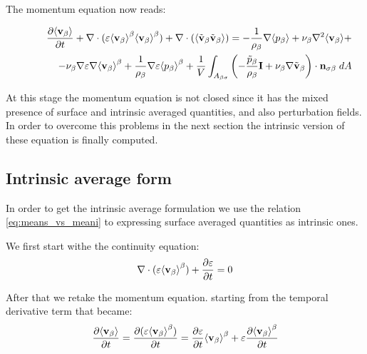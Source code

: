 
The momentum equation now reads:

\begin{eqnarray}
\dfrac{\partial {\left< \textbf{v}_{\beta}\right>}}{\partial t} + \nabla \cdot (\varepsilon {\left< \textbf{v}_{\beta}\right>}^{\beta}{\left< \textbf{v}_{\beta} \right>}^{\beta}) + \nabla \cdot ({\left< \tilde{\textbf{v}}_{\beta}\tilde{\textbf{v}}_{\beta} \right>}) = -\dfrac{1}{\rho_{\beta}} \nabla {\left< p_{\beta}\right>} + \nu_{\beta}\nabla^2 {\left< \textbf{v}_{\beta} \right>} + \nonumber \\
\qquad \qquad - \nu_{\beta} \nabla \varepsilon \nabla {\left< \textbf{v}_{\beta}\right>}^{\beta} +\dfrac{1}{\rho_{\beta}}\nabla\varepsilon {\left< p_{\beta}\right>}^{\beta} +\dfrac{1}{V} \displaystyle\int_{A_{\beta \sigma}} \left( -\dfrac{\tilde{p}_{\beta}}{\rho_{\beta}} \mathbf{I} + \nu_{\beta} \nabla \tilde{\textbf{v}}_{\beta}  \right)\cdot \mathbf{n}_{\sigma \beta} \;dA
\label{eq:NS_2}
\end{eqnarray}

At this stage the momentum equation is not closed since it has the mixed presence of surface and intrinsic averaged quantities, and also perturbation fields.
In order to overcome this problems in the next section the intrinsic version of these equation is finally computed. 

\subsection{Intrinsic average form}

In order to get the intrinsic average formulation we use the relation \eqref{eq:means_vs_meani} to expressing surface averaged quantities as intrinsic ones.

We first start withe the continuity equation:
$$
\nabla \cdot (\varepsilon{\left< \textbf{v}_{\beta}\right>}^{\beta} ) + \dfrac{\partial \varepsilon}{\partial t}= 0
$$

After that we retake the momentum equation. starting from the temporal derivative term that became:
$$
\dfrac{\partial {\left< \textbf{v}_{\beta}\right>}}{\partial t} = \dfrac{\partial (\varepsilon{\left< \textbf{v}_{\beta}\right>}^{\beta})}{\partial t} = \dfrac{\partial \varepsilon}{\partial t}{\left< \textbf{v}_{\beta} \right>}^{\beta} + \varepsilon \dfrac{\partial {\left< \textbf{v}_{\beta}\right>}^{\beta}}{\partial t}
$$

